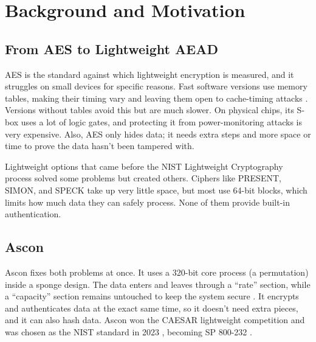 %

\section{Background and Motivation}
\label{sec:background}

\subsection{From AES to Lightweight AEAD}

AES \cite{fips197} is the standard against which lightweight encryption is measured, and it struggles on small devices for specific reasons. Fast software versions use memory tables, making their timing vary and leaving them open to cache-timing attacks \cite{aes-cache}. Versions without tables avoid this but are much slower. On physical chips, its S-box uses a lot of logic gates, and protecting it from power-monitoring attacks is very expensive. Also, AES only hides data; it needs extra steps and more space or time to prove the data hasn't been tampered with.

Lightweight options that came before the NIST Lightweight Cryptography process solved some problems but created others. Ciphers like PRESENT, SIMON, and SPECK \cite{simonspeck} take up very little space, but most use 64-bit blocks, which limits how much data they can safely process. None of them provide built-in authentication.

\subsection{Ascon}

Ascon \cite{caesar,nist-sp800-232} fixes both problems at once. It uses a 320-bit core process (a permutation) inside a sponge design. The data enters and leaves through a ``rate'' section, while a ``capacity'' section remains untouched to keep the system secure \cite{sponge,duplex}. It encrypts and authenticates data at the exact same time, so it doesn't need extra pieces, and it can also hash data. Ascon won the CAESAR lightweight competition and was chosen as the NIST standard in 2023 \cite{nist-lwc-final}, becoming SP 800-232 \cite{nist-sp800-232}.

